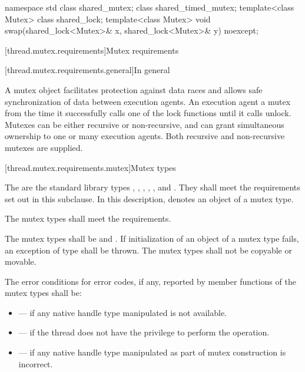 \begin{codeblock}
namespace std {
  class shared_mutex;
  class shared_timed_mutex;
  template<class Mutex> class shared_lock;
  template<class Mutex>
    void swap(shared_lock<Mutex>& x, shared_lock<Mutex>& y) noexcept;
}
\end{codeblock}

[thread.mutex.requirements]{Mutex requirements}

[thread.mutex.requirements.general]{In general}

\pnum
A mutex object facilitates protection against data races and allows safe synchronization of
data between execution agents.
An execution agent  a mutex from the time it successfully calls one of the
lock functions until it calls unlock. Mutexes can be either recursive or non-recursive, and can
grant simultaneous ownership to one or many execution agents. Both
recursive and non-recursive mutexes are supplied.

[thread.mutex.requirements.mutex]{Mutex types}

\pnum
The  are the standard library types ,
, , ,
, and .
They shall meet the requirements set out in this subclause. In this description, 
denotes an object of a mutex type.

\pnum
The mutex types shall meet the  requirements.

\pnum
The mutex types shall be  and . If
initialization of an object of a mutex type fails, an exception of type
 shall be thrown. The mutex types shall not be copyable or movable.

\pnum
The error conditions for error codes, if any, reported by member functions of the mutex types
shall be:
\begin{itemize}
\item {} --- if any native handle type manipulated is not available.
\item {} --- if the thread does not have the
privilege to perform the operation.
\item {} --- if any native handle type manipulated as part of mutex
construction is incorrect.
\end{itemize}

